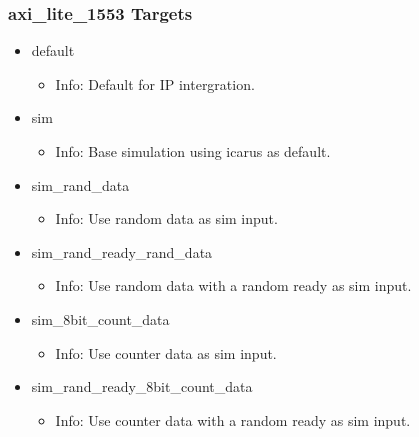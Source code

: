 \subsubsection{axi\_lite\_1553 Targets}
\begin{itemize}
\item default
	\begin{itemize}
	\item[$\space$] Info: Default for IP intergration.
	\end{itemize}
\item sim
	\begin{itemize}
	\item[$\space$] Info: Base simulation using icarus as default.
	\end{itemize}
\item sim\_rand\_data
	\begin{itemize}
	\item[$\space$] Info: Use random data as sim input.
	\end{itemize}
\item sim\_rand\_ready\_rand\_data
	\begin{itemize}
	\item[$\space$] Info: Use random data with a random ready as sim input.
	\end{itemize}
\item sim\_8bit\_count\_data
	\begin{itemize}
	\item[$\space$] Info: Use counter data as sim input.
	\end{itemize}
\item sim\_rand\_ready\_8bit\_count\_data
	\begin{itemize}
	\item[$\space$] Info: Use counter data with a random ready as sim input.
	\end{itemize}
\end{itemize}
